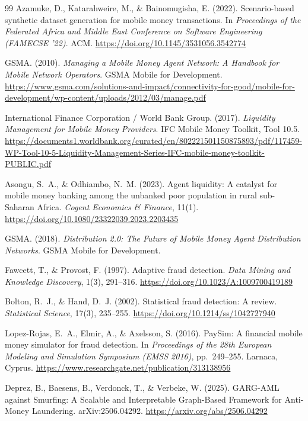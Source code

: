 \documentclass[11pt,a4paper,oneside]{report}
\theoremstyle{definition}
\theoremstyle{remark}
\begin{document}
\begin{thebibliography}{99}
Azamuke, D., Katarahweire, M., \& Bainomugisha, E. (2022).
Scenario-based synthetic dataset generation for mobile money transactions.
In \textit{Proceedings of the Federated Africa and Middle East Conference on Software Engineering (FAMECSE '22)}.
ACM. \url{https://doi.org/10.1145/3531056.3542774}

GSMA. (2010).
\textit{Managing a Mobile Money Agent Network: A Handbook for Mobile Network Operators}.
GSMA Mobile for Development.
\url{https://www.gsma.com/solutions-and-impact/connectivity-for-good/mobile-for-development/wp-content/uploads/2012/03/manage.pdf}

International Finance Corporation / World Bank Group. (2017).
\textit{Liquidity Management for Mobile Money Providers}.
IFC Mobile Money Toolkit, Tool 10.5.
\url{https://documents1.worldbank.org/curated/en/802221501150875893/pdf/117459-WP-Tool-10-5-Liquidity-Management-Series-IFC-mobile-money-toolkit-PUBLIC.pdf}

Asongu, S.~A., \& Odhiambo, N.~M. (2023).
Agent liquidity: A catalyst for mobile money banking among the unbanked poor population in rural sub-Saharan Africa.
\textit{Cogent Economics \& Finance}, 11(1).
\url{https://doi.org/10.1080/23322039.2023.2203435}

GSMA. (2018).
\textit{Distribution 2.0: The Future of Mobile Money Agent Distribution Networks}.
GSMA Mobile for Development.

Fawcett, T., \& Provost, F. (1997).
Adaptive fraud detection.
\textit{Data Mining and Knowledge Discovery}, 1(3), 291--316.
\url{https://doi.org/10.1023/A:1009700419189}

Bolton, R.~J., \& Hand, D.~J. (2002).
Statistical fraud detection: A review.
\textit{Statistical Science}, 17(3), 235--255.
\url{https://doi.org/10.1214/ss/1042727940}

Lopez-Rojas, E.~A., Elmir, A., \& Axelsson, S. (2016).
PaySim: A financial mobile money simulator for fraud detection.
In \textit{Proceedings of the 28th European Modeling and Simulation Symposium (EMSS 2016)}, pp.~249--255.
Larnaca, Cyprus.
\url{https://www.researchgate.net/publication/313138956}

Deprez, B., Baesens, B., Verdonck, T., \& Verbeke, W. (2025).
GARG-AML against Smurfing: A Scalable and Interpretable Graph-Based Framework for Anti-Money Laundering.
arXiv:2506.04292.
\url{https://arxiv.org/abs/2506.04292}


\end{thebibliography}
\end{document}
